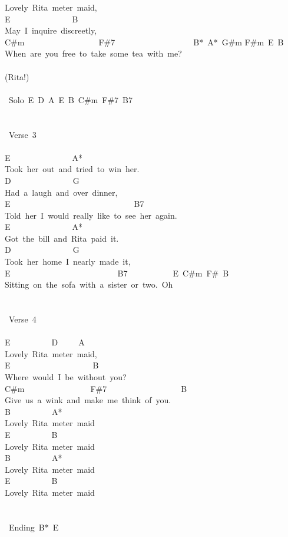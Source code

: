 {Lovely\ Rita\ meter\ maid,\\
E\ \ \ \ \ \ \ \ \ \ \ \ \ \ \ B\\
May\ I\ inquire\ discreetly,\\
C\#m\ \ \ \ \ \ \ \ \ \ \ \ \ \ \ \ \ \ F\#7\ \ \ \ \ \ \ \ \ \ \ \ \ \ \ \ \ \ \ B*\ A*\ G\#m F\#m\ E\ B\\
When\ are\ you\ free\ to\ take\ some\ tea\ with\ me?\\
\\
(Rita!)\\
\\
\lbrack\ Solo\rbrack\ E\ D\ A\ E\ B\ C\#m\ F\#7\ B7\\
\\
\\
\lbrack\ Verse\ 3\rbrack\\
\\
E\ \ \ \ \ \ \ \ \ \ \ \ \ \ \ A*\\
Took\ her\ out\ and\ tried\ to\ win\ her.\\
D\ \ \ \ \ \ \ \ \ \ \ \ \ \ \ G\\
Had\ a\ laugh\ and\ over\ dinner,\\
E\ \ \ \ \ \ \ \ \ \ \ \ \ \ \ \ \ \ \ \ \ \ \ \ \ \ \ \ \ \ B7\\
Told\ her\ I\ would\ really\ like\ to\ see\ her\ again.\\
E\ \ \ \ \ \ \ \ \ \ \ \ \ \ \ A*\\
Got\ the\ bill\ and\ Rita\ paid\ it.\\
D\ \ \ \ \ \ \ \ \ \ \ \ \ \ \ G\\
Took\ her\ home\ I\ nearly\ made\ it,\\
E\ \ \ \ \ \ \ \ \ \ \ \ \ \ \ \ \ \ \ \ \ \ \ \ \ \ B7\ \ \ \ \ \ \ \ \ \ \ E\ C\#m\ F\#\ B\\
Sitting\ on\ the\ sofa\ with\ a\ sister\ or\ two.\ Oh\\
\\
\\
\lbrack\ Verse\ 4\rbrack\\
\\
E\ \ \ \ \ \ \ \ \ \ D\ \ \ \ \ A\\
Lovely\ Rita\ meter\ maid,\\
E\ \ \ \ \ \ \ \ \ \ \ \ \ \ \ \ \ \ \ \ B\\
Where\ would\ I\ be\ without\ you?\\
C\#m\ \ \ \ \ \ \ \ \ \ \ \ \ \ \ \ F\#7\ \ \ \ \ \ \ \ \ \ \ \ \ \ \ \ \ \ B\\
Give\ us\ a\ wink\ and\ make\ me\ think\ of\ you.\\
B\ \ \ \ \ \ \ \ \ \ A*\\
Lovely\ Rita\ meter\ maid\\
E\ \ \ \ \ \ \ \ \ \ B\\
Lovely\ Rita\ meter\ maid\\
B\ \ \ \ \ \ \ \ \ \ A*\\
Lovely\ Rita\ meter\ maid\\
E\ \ \ \ \ \ \ \ \ \ B\\
Lovely\ Rita\ meter\ maid\\
\\
\\
\lbrack\ Ending\rbrack\ B*\ E}

